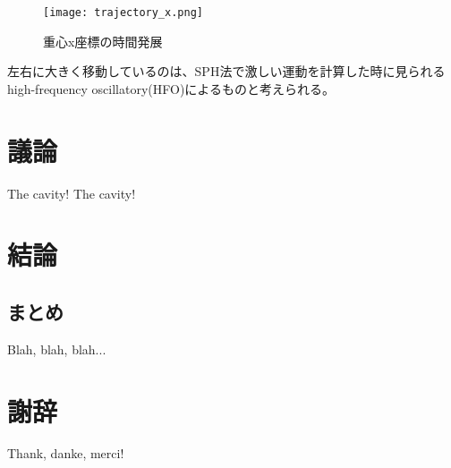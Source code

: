 \documentclass[]{jsarticle}
\begin{document}
\begin{figure}[H]
  \centering
  \texttt{[image: trajectory\_x.png]}
  \caption{重心x座標の時間発展}
  \label{fig:trajectory}
\end{figure}

左右に大きく移動しているのは、SPH法で激しい運動を計算した時に見られるhigh-frequency oscillatory(HFO)\cite{Kiara2013}によるものと考えられる。
\newpage

\section{議論}
The cavity! The cavity!
\newpage
\section{結論}
\subsection{まとめ}
Blah, blah, blah...
\newpage

\section{謝辞}
Thank, danke, merci!
\newpage



\end{document}
